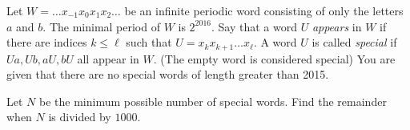 Let $W = \ldots x_{-1}x_0x_1x_2 \ldots$ be an infinite periodic word consisting of only the letters $a$ and $b$. The minimal period of $W$ is $2^{2016}$. Say that a word $U$ \emph{appears} in $W$ if there are indices $k \le \ell$ such that $U = x_kx_{k+1} \ldots x_{\ell}$. A word $U$ is called \emph{special} if $Ua, Ub, aU, bU$ all appear in $W$. (The empty word is considered special) You are given that there are no special words of length greater than 2015.

Let $N$ be the minimum possible number of special words. Find the remainder when $N$ is divided by $1000$.

